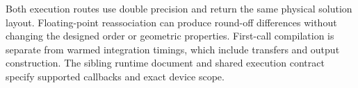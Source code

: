 \documentclass[11pt,a4paper]{article}
\begin{document}
Both execution routes use double precision and return the same physical
solution layout. Floating-point reassociation can produce round-off
differences without changing the designed order or geometric properties.
First-call compilation is separate from warmed integration timings, which
include transfers and output construction. The sibling runtime document and
shared execution contract specify supported callbacks and exact device scope.
\end{document}
